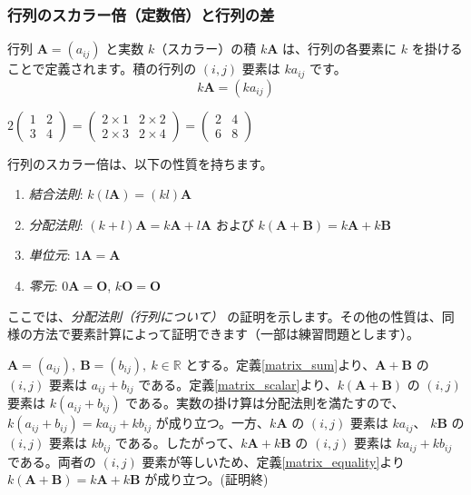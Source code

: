 \subsubsection{行列のスカラー倍（定数倍）と行列の差}

\begin{dfn}[行列のスカラー倍] \label{matrix_scalar}
行列 $\bm{A} = (a_{ij})$ と実数 $k$（スカラー）の積 $k\bm{A}$ は、行列の各要素に $k$ を掛けることで定義されます。積の行列の $(i,j)$ 要素は $k a_{ij}$ です。
\[k\bm{A} = (k a_{ij})\]
\end{dfn}

\begin{ex}
$2 \begin{pmatrix} 1 & 2 \\ 3 & 4 \end{pmatrix} = \begin{pmatrix} 2 \times 1 & 2 \times 2 \\ 2 \times 3 & 2 \times 4 \end{pmatrix} = \begin{pmatrix} 2 & 4 \\ 6 & 8 \end{pmatrix}$
\end{ex}

\begin{thm}[行列のスカラー倍の性質] \label{matrix_scalar_property}
行列のスカラー倍は、以下の性質を持ちます。
\begin{enumerate}
\item \emph{結合法則}: $k(l\bm{A}) = (kl)\bm{A}$
\item \emph{分配法則}: $(k+l)\bm{A} = k\bm{A} + l\bm{A}$ および $k(\bm{A}+\bm{B}) = k\bm{A} + k\bm{B}$
\item \emph{単位元}: $1\bm{A} = \bm{A}$
\item \emph{零元}: $0\bm{A} = \bm{O}$, $k\bm{O} = \bm{O}$
\end{enumerate}
\begin{proof*}
ここでは、\emph{分配法則（行列について）} の証明を示します。その他の性質は、同様の方法で要素計算によって証明できます（一部は練習問題とします）。\par
$\bm{A} = (a_{ij}),\ \bm{B} = (b_{ij}),\ k\in\mathbb{R}$ とする。定義\ref{matrix_sum}より、$\bm{A} + \bm{B}$ の $(i,j)$ 要素は $a_{ij} + b_{ij}$ である。定義\ref{matrix_scalar}より、$k(\bm{A} + \bm{B})$ の $(i,j)$ 要素は $k(a_{ij} + b_{ij})$ である。実数の掛け算は分配法則を満たすので、$k(a_{ij} + b_{ij}) = k a_{ij} + k b_{ij}$ が成り立つ。一方、$k\bm{A}$ の $(i,j)$ 要素は $k a_{ij}$、 $k\bm{B}$ の $(i,j)$ 要素は $k b_{ij}$ である。したがって、$k\bm{A} + k\bm{B}$ の $(i,j)$ 要素は $k a_{ij} + k b_{ij}$ である。両者の $(i,j)$ 要素が等しいため、定義\ref{matrix_equality}より $k(\bm{A}+\bm{B}) = k\bm{A} + k\bm{B}$ が成り立つ。(証明終)
\end{proof*}
\end{thm}

